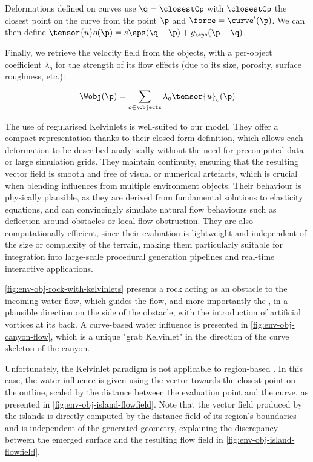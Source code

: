 Deformations defined on curves use $\q = \closestCp$ with $\closestCp$ the closest point on the curve from the point $\p$ and $\force = \curve'(\p)$. We can then define $\tensor{u}o(\p) = s\eps(\q - \p) + g_\eps(\p - \q)$.

Finally, we retrieve the velocity field from the objects, with a per-object coefficient $\lambda_o$ for the strength of its flow effects (due to its size, porosity, surface roughness, etc.):
\begin{align}
    \Wobj(\p) = \sum_{o \in \objects}^{}{\lambda_o \tensor{u}_o(\p)}
\end{align}

The use of regularised Kelvinlets is well-suited to our model. They offer a compact representation thanks to their closed-form definition, which allows each deformation to be described analytically without the need for precomputed data or large simulation grids. They maintain continuity, ensuring that the resulting vector field is smooth and free of visual or numerical artefacts, which is crucial when blending influences from multiple environment objects. Their behaviour is physically plausible, as they are derived from fundamental solutions to elasticity equations, and can convincingly simulate natural flow behaviours such as deflection around obstacles or local flow obstruction. They are also computationally efficient, since their evaluation is lightweight and independent of the size or complexity of the terrain, making them particularly suitable for integration into large-scale procedural generation pipelines and real-time interactive applications.

\cref{fig:env-obj-rock-with-kelvinlets} presents a rock acting as an obstacle to the incoming water flow, which guides the flow, and more importantly the , in a plausible direction on the side of the obstacle, with the introduction of artificial vortices at its back. A curve-based water influence is presented in \cref{fig:env-obj-canyon-flow}, which is a unique "grab Kelvinlet" in the direction of the curve skeleton of the canyon.

Unfortunately, the Kelvinlet paradigm is not applicable to region-based . In this case, the water influence is given using the vector towards the closest point on the outline, scaled by the distance between the evaluation point and the curve, as presented in \cref{fig:env-obj-island-flowfield}. Note that the vector field produced by the islands is directly computed by the distance field of its region's boundaries and is independent of the generated geometry, explaining the discrepancy between the emerged surface and the resulting flow field in \cref{fig:env-obj-island-flowfield}.

